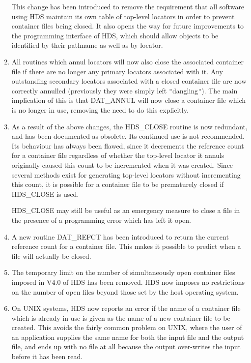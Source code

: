 \documentclass[11pt]{article}
\newcommand{\htmlref}[2]{#1}
\newcommand{\qt}[1]{``#1''}
\renewcommand{\qt}[1]{{\tt{"}}#1{\tt{"}}}
\begin{document}
\begin{enumerate}
This change has been introduced to remove the requirement that all
software using HDS maintain its own table of top-level locators in
order to prevent container files being closed. It also opens the way
for future improvements to the programming interface of HDS, which
should allow objects to be identified by their pathname as well as by
locator.

\item
All routines which \htmlref{annul}{sect:annul}
\htmlref{locators}{sect:locators} will now also close the associated
container file if there are no longer any
\htmlref{primary}{sect:primary} locators associated with it. Any
outstanding secondary locators associated with a closed container file
are now correctly annulled (previously they were simply left
\qt{dangling}). The main implication of this is that
\htmlref{DAT\_ANNUL}{DAT_ANNUL} will now close a container file which
is no longer in use, removing the need to do this explicitly.

\item
As a result of the above changes, the \htmlref{HDS\_CLOSE}{HDS_CLOSE}
routine is now redundant, and has been documented as obsolete. Its
continued use is not recommended. Its behaviour has always been
flawed, since it decrements the reference count for a container file
regardless of whether the top-level \htmlref{locator}{sect:locators} it annuls originally
caused this count to be incremented when it was created. Since several
methods exist for generating top-level locators without incrementing
this count, it is possible for a container file to be prematurely
closed if HDS\_CLOSE is used.

HDS\_CLOSE may still be useful as an emergency measure to close a file
in the presence of a programming error which has left it open.

\item
A new routine \htmlref{DAT\_REFCT}{DAT_REFCT} has been introduced to
return the current reference count for a container file. This makes it
possible to predict when a file will actually be closed.

\item
The temporary limit on the number of simultaneously open container
files imposed in V4.0 of HDS has been removed. HDS now imposes no
restrictions on the number of open files beyond those set by the host
operating system.

\item
On UNIX systems, HDS now reports an error if the name of a container
file which is already in use is given as the name of a new container
file to be created.  This avoids the fairly common problem on UNIX,
where the user of an application supplies the same name for both the
input file and the output file, and ends up with no file at all
because the output over-writes the input before it has been read.


\end{enumerate}
\end{document}

